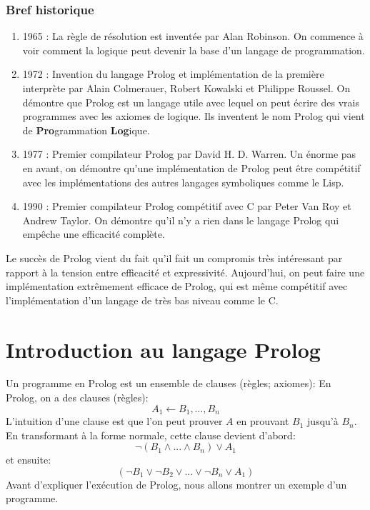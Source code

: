 \subsubsection{Bref historique}

\begin{enumerate}
	\item 1965 : 	La règle de résolution est inventée par Alan Robinson.
On commence à voir comment la logique peut devenir la base d'un langage de programmation.
	\item 1972 :	Invention du langage Prolog et implémentation de la première interprète
par Alain Colmerauer, Robert Kowalski et Philippe Roussel. 
On démontre que Prolog est un langage utile avec lequel on peut écrire des vrais programmes
avec les axiomes de logique.
Ils inventent le nom Prolog qui vient de {\bf Pro}grammation {\bf Log}ique.
        \item 1977 :    Premier compilateur Prolog par David H. D. Warren.
Un énorme pas en avant, on démontre qu'une implémentation de Prolog peut être compétitif
avec les implémentations des autres langages symboliques comme le Lisp.
        \item 1990 :    Premier compilateur Prolog compétitif avec C par Peter Van Roy et Andrew Taylor.
On démontre qu'il n'y a rien dans le langage Prolog qui empêche une efficacité complète.
\end{enumerate}
Le succès de Prolog vient du fait qu'il fait
un compromis très intéressant par rapport à la tension entre efficacité et expressivité.
Aujourd'hui, on peut faire une implémentation extrêmement efficace de Prolog, qui est même compétitif avec
l'implémentation d'un langage de très bas niveau comme le C.

\section{Introduction au langage Prolog}

Un programme en Prolog est un ensemble de clauses (règles; axiomes):
En Prolog, on a des clauses (règles):
	\begin{equation}
		 A_1 \leftarrow B_1, … , B_n
	\end{equation}
L'intuition d'une clause est que l'on peut prouver $A$ en prouvant $B_1$ jusqu'à $B_n$.
En transformant à la forme normale, cette clause devient d'abord:
	 \begin{equation}
	 	\neg (B_{1} \wedge ... \wedge B_{n}) \vee A_{1}
	 \end{equation}
et ensuite:
	 \begin{equation}
	 	 (\neg B_{1} \vee \neg B_{2} \vee ... \vee \neg B_{n} \vee A_{1})
	 \end{equation}
Avant d'expliquer l'exécution de Prolog, nous allons montrer un exemple d'un programme.

